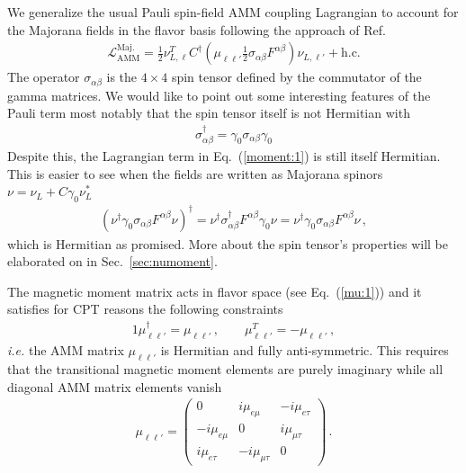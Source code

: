 \documentclass[addchapnum]{ws-rv961x669} %
\newcommand{\req}[1]{Eq.~(\ref{#1})}
\newcommand{\rsec}[1]{Sec.~{\ref{#1}}}
\begin{document}
We generalize the usual Pauli spin-field AMM coupling Lagrangian to account for the Majorana fields in the flavor basis following the approach of Ref.~\citeauthor{giunti2007fundamentals}
\begin{align}
	\label{moment:1}
    \mathcal{L}_{\mathrm{AMM}}^\mathrm{Maj.}=\frac{1}{2}\nu_{L,\ell}^{T}C^{\dag}\left(\mu_{\ell\ell'}\frac{1}{2}\sigma_{\alpha\beta}F^{\alpha\beta}\right)\nu_{L,\ell'}+\mathrm{h.c.}
\end{align}
The operator $\sigma_{\alpha\beta}$ is the $4\times 4$ spin tensor defined by the commutator of the gamma matrices. We would like to point out some interesting features of the Pauli term most notably that the spin tensor itself is not Hermitian with
\begin{align}
    \label{notherm:1}
    \sigma_{\alpha\beta}^{\dag} = \gamma_{0}\sigma_{\alpha\beta}\gamma_{0}
\end{align}
Despite this, the Lagrangian term in \req{moment:1} is still itself Hermitian. This is easier to see when the fields are written as Majorana spinors $\nu=\nu_{L}+C\gamma_{0}\nu_{L}^{*}$
\begin{align}
    \left(\nu^{\dag}\gamma_{0}\sigma_{\alpha\beta}F^{\alpha\beta}\nu\right)^{\dag} = \nu^{\dag}\sigma_{\alpha\beta}^{\dag}F^{\alpha\beta}\gamma_{0}\nu = \nu^{\dag}\gamma_{0}\sigma_{\alpha\beta}F^{\alpha\beta}\nu\,,
\end{align}
which is Hermitian as promised. More about the spin tensor's properties will be elaborated on in \rsec{sec:numoment}.

The magnetic moment matrix acts in flavor space (see \req{mu:1}) and it satisfies for CPT reasons the following constraints~\cite{Giunti:2014ixa}
\begin{alignat}{1}
	\label{props:1}
    \mu_{\ell\ell'}^{\dag}=\mu_{\ell\ell'}\,,\qquad
    \mu_{\ell\ell'}^{T}=-\mu_{\ell\ell'}\,,
\end{alignat}
{\it i.e.\/} the AMM matrix $\mu_{\ell\ell'}$ is Hermitian and fully anti-symmetric. This requires that the transitional magnetic moment elements are purely imaginary while all diagonal AMM matrix elements vanish
\begin{align}
    \mu_{\ell\ell'}=
    \begin{pmatrix}
        0 & i\mu_{e\mu} & -i\mu_{e\tau} \\
		-i\mu_{e\mu} & 0 & i\mu_{\mu\tau} \\
		i\mu_{e\tau} & -i\mu_{\mu\tau} & 0
    \end{pmatrix}\,.
\end{align}
\end{document}
